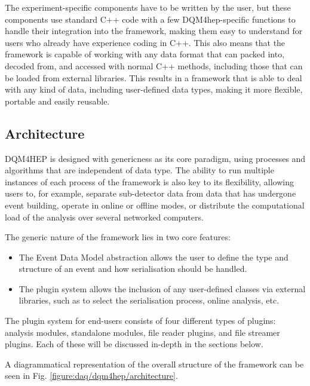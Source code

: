 The experiment-specific components have to be written by the user, but these components use standard C++ code with a few DQM4hep-specific functions to handle their integration into the framework, making them easy to understand for users who already have experience coding in C++. This also means that the framework is capable of working with any data format that can packed into, decoded from, and accessed with normal C++ methods, including those that can be loaded from external libraries. This results in a framework that is able to deal with any kind of data, including user-defined data types, making it more flexible, portable and easily reusable.

\subsection{Architecture}
DQM4HEP is designed with genericness as its core paradigm, using processes and algorithms that are independent of data type. The ability to run multiple instances of each process of the framework is also key to its flexibility, allowing users to, for example, separate sub-detector data from data that has undergone event building, operate in online or offline modes, or distribute the computational load of the analysis over several networked computers.

The generic nature of the framework lies in two core features:
\begin{itemize}
	\item The Event Data Model abstraction allows the user to define the type and structure of an event and how serialisation should be handled.
	\item The plugin system allows the inclusion of any user-defined classes via external libraries, such as to select the serialisation process, online analysis, etc.
\end{itemize}

The plugin system for end-users consists of four different types of plugins: analysis modules, standalone modules, file reader plugins, and file streamer plugins. Each of these will be discussed in-depth in the sections below.

A diagrammatical representation of the overall structure of the framework can be seen in Fig. \ref{figure:daq/dqm4hep/architecture}.

